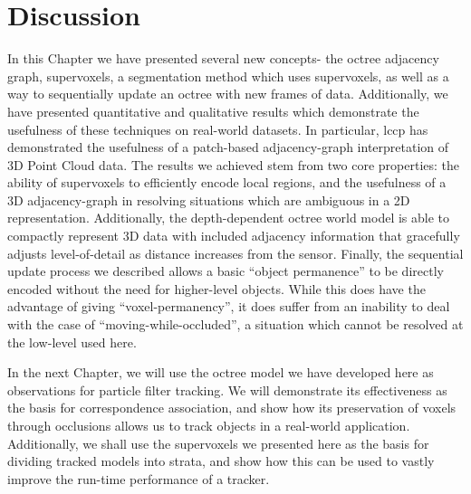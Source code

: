 \section{Discussion}

In this Chapter we have presented several new concepts- the octree adjacency graph, supervoxels, a segmentation method which uses supervoxels, as well as a way to sequentially update an octree with new frames of data. Additionally, we have presented quantitative and qualitative results which demonstrate the usefulness of these techniques on real-world datasets. In particular, \gls{lccp} has demonstrated the usefulness of a patch-based adjacency-graph interpretation of 3D Point Cloud data. The results we achieved stem from two core properties: the ability of supervoxels to efficiently encode local regions, and the usefulness of a 3D adjacency-graph in resolving situations which are ambiguous in a 2D representation. Additionally, the depth-dependent octree world model is able to compactly represent 3D data with included adjacency information that gracefully adjusts level-of-detail as distance increases from the sensor. Finally, the sequential update process we described allows a basic ``object permanence'' to be directly encoded without the need for higher-level objects. While this does have the advantage of giving ``voxel-permanency'', it does suffer from an inability to deal with the case of ``moving-while-occluded'', a situation which cannot be resolved at the low-level used here. 

In the next Chapter, we will use the octree model we have developed here as observations for particle filter tracking. We will demonstrate its effectiveness as the basis for correspondence association, and show how its preservation of voxels through occlusions allows us to track objects in a real-world application. Additionally, we shall use the supervoxels we presented here as the basis for dividing tracked models into strata, and show how this can be used to vastly improve the run-time performance of a tracker. 
